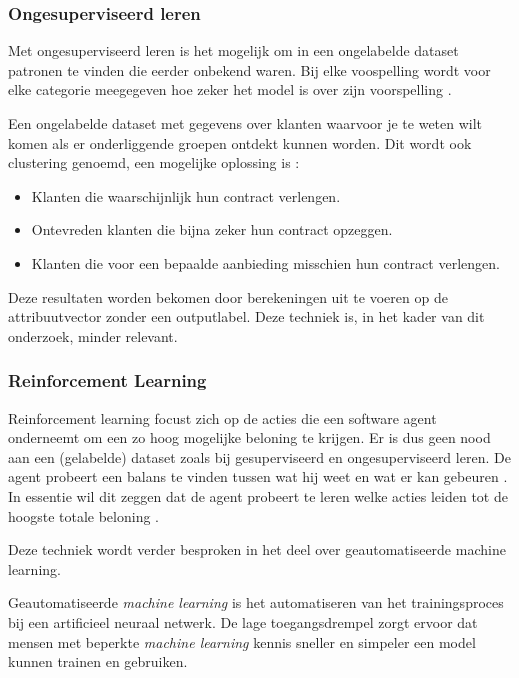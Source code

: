 \subsubsection{Ongesuperviseerd leren}
\label{subsubsec:ongesuperviseerd-leren}

Met ongesuperviseerd leren is het mogelijk om in een ongelabelde dataset patronen te vinden die eerder onbekend waren. Bij elke voospelling wordt voor elke categorie meegegeven hoe zeker het model is over zijn voorspelling \autocite{Hinton1999}.

Een ongelabelde dataset met gegevens over klanten waarvoor je te weten wilt komen als er onderliggende groepen ontdekt kunnen worden. Dit wordt ook clustering genoemd, een mogelijke oplossing is \autocite{Lievens2019}:

\begin{itemize}
    \item Klanten die waarschijnlijk hun contract verlengen.
    \item Ontevreden klanten die bijna zeker hun contract opzeggen.
    \item Klanten die voor een bepaalde aanbieding misschien hun contract verlengen.
\end{itemize}

Deze resultaten worden bekomen door berekeningen uit te voeren op de attribuutvector zonder een outputlabel. Deze techniek is, in het kader van dit onderzoek, minder relevant.

\subsubsection{Reinforcement Learning}
\label{subsubsec:reinforcement-learning}

Reinforcement learning focust zich op de acties die een software agent onderneemt om een zo hoog mogelijke beloning te krijgen. Er is dus geen nood aan een (gelabelde) dataset zoals bij gesuperviseerd en ongesuperviseerd leren. De agent probeert een balans te vinden tussen wat hij weet en wat er kan gebeuren \autocite{Kaelbling1996}. In essentie wil dit zeggen dat de agent probeert te leren welke acties leiden tot de hoogste totale beloning \autocite{Lievens2019}.

Deze techniek wordt verder besproken in het deel over geautomatiseerde machine learning.


Geautomatiseerde \textit{machine learning} is het automatiseren van het trainingsproces bij een artificieel neuraal netwerk. De lage toegangsdrempel zorgt ervoor dat mensen met beperkte \textit{machine learning }kennis sneller en simpeler een model kunnen trainen en gebruiken.

